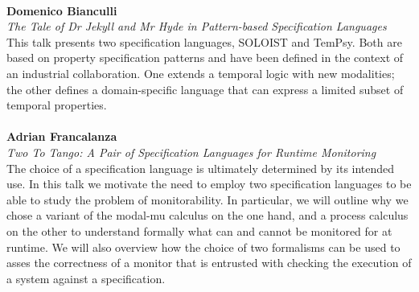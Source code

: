 \documentclass{article}
\newcounter{talkc}
\newcommand{\talk}[3]{\stepcounter{talkc}
\vspace{0.5em}~\\
\noindent
\textbf{#1}\\ 
\noindent\emph{#2}\\ 
\noindent#3\\
}
\begin{document}
%
\talk{Domenico Bianculli}{The Tale of Dr Jekyll and Mr Hyde in Pattern-based Specification Languages}{This talk presents two specification languages, SOLOIST and TemPsy. Both are based on property specification patterns and have been defined in the context of an industrial collaboration. One extends a temporal logic with new modalities; the other defines a domain-specific language  that can express a limited subset of temporal properties.}



%
\talk{Adrian Francalanza}{Two To Tango: A Pair of Specification Languages for Runtime Monitoring}{The choice of a specification language is ultimately determined by its intended use.  In this talk we motivate the need to employ two specification languages to be able to study the problem of monitorability.  In particular, we will outline why we chose a variant of the modal-mu calculus on the one hand, and a process calculus on the other to understand formally what can and cannot be monitored for at runtime.  We will also overview how the choice of two formalisms can be used to asses the correctness of a monitor that is entrusted with checking the execution of a system against a specification.}

\end{document}
